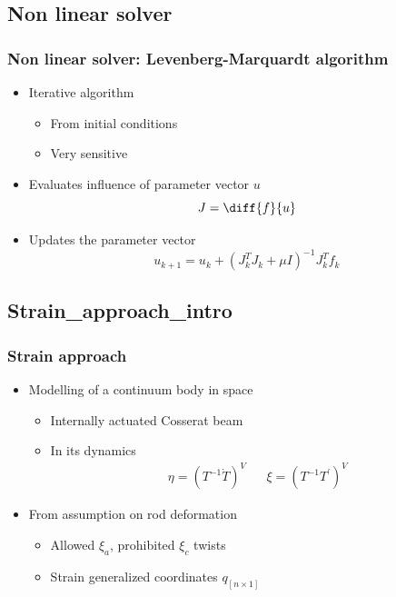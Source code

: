 \documentclass[compress]{thesisbeamer}
\begin{document}
		\subsection{Non linear solver}
        \begin{frame}
        	\frametitle{Non linear solver: Levenberg-Marquardt algorithm}
			\begin{itemize}%
  				\item Iterative algorithm
  				\begin{itemize}
  					\item From initial conditions
  					\item Very sensitive
  				\end{itemize}
  				\item Evaluates influence of parameter vector $ u $
  				\begin{equation}
  				J = \diff{f}{u}
  				\end{equation}
  				\item Updates the parameter vector
  				\begin{equation}
  				{u}_{k+1} = {u}_{k} + {\left({J}_{k}^{T} {J}_{k} + \mu I \right)}^{-1} {J}_{k}^{T} {f}_{k}
  				\end{equation}
 			\end{itemize}
		\end{frame}
		
		\subsection{Strain_approach_intro}
        \begin{frame}
        	\frametitle{Strain approach}
			\begin{itemize}%
  				\item Modelling of a continuum body in space
  				\begin{itemize}
  					\item Internally actuated Cosserat beam
  					\item In its dynamics
  					\begin{align}
  						\eta = \left( T^{-1}\dot{T} \right)^V && \xi = \left( T^{-1} {T}^{'} \right)^V
  					\end{align}
				\end{itemize}
  				\item From assumption on rod deformation
  				\begin{itemize}
  					\item Allowed $ \xi_a $, prohibited $ \xi_c $ twists
  					\item Strain generalized coordinates $ q_{[n\times1]}$
  				\end{itemize}
 			\end{itemize}
		\end{frame}
		
\end{document}
